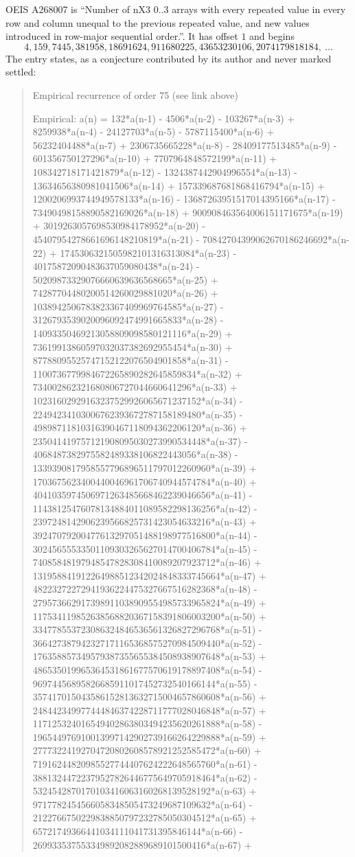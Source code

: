 \documentclass[11pt,a4paper]{article}
\theoremstyle{plain}
\theoremstyle{definition}
\begin{document}
OEIS A268007 is ``Number of nX3 0..3 arrays with every repeated value in every row and column unequal to the previous repeated value, and new values introduced in row-major sequential order.''. It has offset $1$ and begins
\[
4, 159, 7445, 381958, 18691624, 911680225, 43653230106, 2074179818184,\ \dots
\]
The entry states, as a conjecture contributed by its author and never marked settled:
\begin{quote}
Empirical recurrence of order 75 (see link above)

Empirical: a(n) = 132*a(n-1) - 4506*a(n-2) - 103267*a(n-3) + 8259938*a(n-4) - 24127703*a(n-5) - 5787115400*a(n-6) + 56232404488*a(n-7) + 2306735665228*a(n-8) - 28409177513485*a(n-9) - 601356750127296*a(n-10) + 7707964848572199*a(n-11) + 108342718171421879*a(n-12) - 1324387442904996554*a(n-13) - 13634656380981041506*a(n-14) + 157339687681868416794*a(n-15) + 1200206993744949578133*a(n-16) - 13687263951517014395166*a(n-17) - 73490498158890582169026*a(n-18) + 900908463564006151171675*a(n-19) + 3019263057698530984178952*a(n-20) - 45407954278661696148210819*a(n-21) - 70842704399062670186246692*a(n-22) + 1745306321505982101316313084*a(n-23) - 40175872090483637059080438*a(n-24) - 50209873329076660639636568665*a(n-25) + 74287704480200514260029881020*a(n-26) + 1038942506783823367409969764585*a(n-27) - 3126793539020096092474991665833*a(n-28) - 14093350469213058809098580121116*a(n-29) + 73619913860597032037382692955454*a(n-30) + 87788095525747152122076504901858*a(n-31) - 1100736779984672265890282645859834*a(n-32) + 734002862321680806727044660641296*a(n-33) + 10231602929163237529926065671237152*a(n-34) - 22494234103006762393672787158189480*a(n-35) - 49898711810316390467118094362206120*a(n-36) + 235041419757121908095030273990534448*a(n-37) - 4068487382975582489338106822443056*a(n-38) - 1339390817958557796896511797012260960*a(n-39) + 1703675623400440046961706740944574784*a(n-40) + 4041035974506971263485668462239046656*a(n-41) - 11438125476078134884011089582298136256*a(n-42) - 2397248142906239566825731423054633216*a(n-43) + 39247079200477613297051488198977516800*a(n-44) - 30245655533501109303265627014700406784*a(n-45) - 74085848197948547828308410089207923712*a(n-46) + 131958841912264988512342024848333745664*a(n-47) + 48223272272941936224475327667516282368*a(n-48) - 279573662917398911038909554985733965824*a(n-49) + 117534119852638568820367158391806003200*a(n-50) + 334778553723086324846536561326827296768*a(n-51) - 366427387942327171165368575270984509440*a(n-52) - 176358857349579387355655384508938907648*a(n-53) + 486535019965364531861677570619178897408*a(n-54) - 96974456895826685911017452732540166144*a(n-55) - 357417015043586152813632715004657860608*a(n-56) + 248442349977444846374228711777028046848*a(n-57) + 117125324016549402863803494235620261888*a(n-58) - 196544976910013997142902739166264229888*a(n-59) + 27773224192704720802608578921252585472*a(n-60) + 71916244820985527744407624222648565760*a(n-61) - 38813244722379527826446775649705918464*a(n-62) - 5324542870170103416063160268139528192*a(n-63) + 9717782454566058348505473249687109632*a(n-64) - 2122766750229838850797232785050304512*a(n-65) + 65721749366441034111041731395846144*a(n-66) - 269933537553349892082889689101500416*a(n-67) + 
\end{quote}
\end{document}
